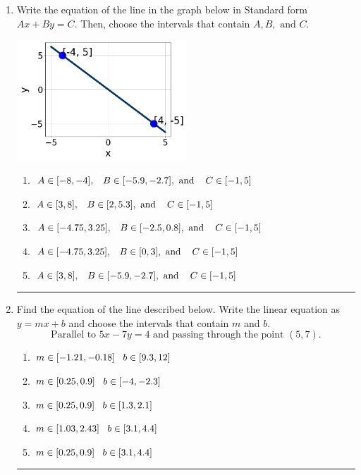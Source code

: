 \documentclass[14pt]{extbook}
\newcommand{\litem}[1]{\item#1\hspace*{-1cm}\rule{\textwidth}{0.4pt}}
\begin{document}
\begin{enumerate}
{\begin{enumerate}[label=\Alph*.]
\end{enumerate} }
\litem{
Write the equation of the line in the graph below in Standard form $Ax+By=C$. Then, choose the intervals that contain $A, B, \text{ and } C$.
\begin{center}
    \includegraphics[width=0.5\textwidth]{../Figures/linearGraphToStandardCopyA.png}
\end{center}
\begin{enumerate}[label=\Alph*.]
\item \( A \in [-8, -4], \hspace{3mm} B \in [-5.9, -2.7], \text{ and } \hspace{3mm} C \in [-1, 5] \)
\item \( A \in [3, 8], \hspace{3mm} B \in [2, 5.3], \text{ and } \hspace{3mm} C \in [-1, 5] \)
\item \( A \in [-4.75, 3.25], \hspace{3mm} B \in [-2.5, 0.8], \text{ and } \hspace{3mm} C \in [-1, 5] \)
\item \( A \in [-4.75, 3.25], \hspace{3mm} B \in [0, 3], \text{ and } \hspace{3mm} C \in [-1, 5] \)
\item \( A \in [3, 8], \hspace{3mm} B \in [-5.9, -2.7], \text{ and } \hspace{3mm} C \in [-1, 5] \)

\end{enumerate} }
\litem{
Find the equation of the line described below. Write the linear equation as $ y=mx+b $ and choose the intervals that contain $m$ and $b$.\[ \text{Parallel to } 5 x - 7 y = 4 \text{ and passing through the point } (5, 7). \]\begin{enumerate}[label=\Alph*.]
\item \( m \in [-1.21, -0.18] \hspace*{3mm} b \in [9.3, 12] \)
\item \( m \in [0.25, 0.9] \hspace*{3mm} b \in [-4, -2.3] \)
\item \( m \in [0.25, 0.9] \hspace*{3mm} b \in [1.3, 2.1] \)
\item \( m \in [1.03, 2.43] \hspace*{3mm} b \in [3.1, 4.4] \)
\item \( m \in [0.25, 0.9] \hspace*{3mm} b \in [3.1, 4.4] \)


\end{enumerate}}
\end{enumerate}
\end{document}
